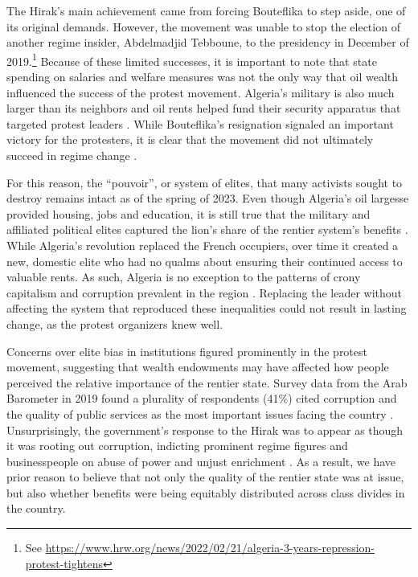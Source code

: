 \documentclass[12pt, letterpaper]{article}
\begin{document}
The Hirak's main achievement came from forcing Bouteflika to step aside, one of its original demands. However, the movement was unable to stop the election of another regime insider, Abdelmadjid Tebboune, to the presidency in December of 2019.\footnote{See \url{https://www.hrw.org/news/2022/02/21/algeria-3-years-repression-protest-tightens}} Because of these limited successes, it is important to note that state spending on salaries and welfare measures was not the only way that oil wealth influenced the success of the protest movement. Algeria's military is also much larger than its neighbors and oil rents helped fund their security apparatus that targeted protest leaders \parencite[52-55]{brownlee_arab_2015}. While Bouteflika's resignation signaled an important victory for the protesters, it is clear that the movement did not ultimately succeed in regime change \parencite{grewal_why_2021}. 

For this reason, the ``pouvoir'', or system of elites, that many activists sought to destroy remains intact as of the spring of 2023. Even though Algeria's oil largesse provided housing, jobs and education, it is still true that the military and affiliated political elites captured the lion's share of the rentier system's benefits \parencite{dillman_state_2000}. While Algeria's revolution replaced the French occupiers, over time it created a new, domestic elite who had no qualms about ensuring their continued access to valuable rents. As such, Algeria is no exception to the patterns of crony capitalism and corruption prevalent in the region \parencite{malik_introduction_2020}. Replacing the leader without affecting the system that reproduced these inequalities could not result in lasting change, as the protest organizers knew well.

Concerns over elite bias in institutions figured prominently in the protest movement, suggesting that wealth endowments may have affected how people perceived the relative importance of the rentier state. Survey data from the  Arab Barometer in 2019 found a plurality of respondents (41\%) cited corruption and the quality of public services as the most important issues facing the country \parencite[4]{robbins_algeria_2019}.  Unsurprisingly, the government's response to the Hirak was to appear as though it was rooting out corruption, indicting prominent regime figures and businesspeople on abuse of power and unjust enrichment \parencite{marwane_after_2021}. As a result, we have prior reason to believe that not only the quality of the rentier state was at issue, but also whether benefits were being equitably distributed across class divides in the country.
\end{document}
